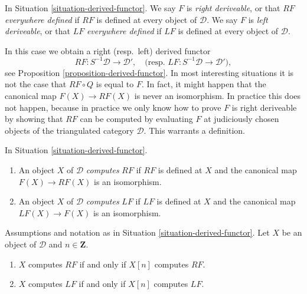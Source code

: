 \begin{definition}
\label{definition-everywhere-defined}
In
Situation \ref{situation-derived-functor}.
We say $F$ is {\it right deriveable}, or that $RF$ {\it everywhere defined}
if $RF$ is defined at every object of $\mathcal{D}$.
We say $F$ is {\it left deriveable}, or that $LF$ {\it everywhere defined}
if $LF$ is defined at every object of $\mathcal{D}$.
\end{definition}

\noindent
In this case we obtain a right (resp.\ left) derived functor
\begin{equation}
\label{equation-everywhere}
RF : S^{-1}\mathcal{D} \longrightarrow \mathcal{D}',
\quad\text{(resp. }
LF : S^{-1}\mathcal{D} \longrightarrow \mathcal{D}'),
\end{equation}
see
Proposition \ref{proposition-derived-functor}.
In most interesting situations it is not the case that $RF \circ Q$ is
equal to $F$. In fact, it might happen that the canonical map
$F(X) \to RF(X)$ is never an isomorphism. In practice this does not happen,
because in practice we only know how to prove $F$ is right deriveable by
showing that $RF$ can be computed by evaluating $F$ at judiciously chosen
objects of the triangulated category $\mathcal{D}$. This warrants
a definition.

\begin{definition}
\label{definition-computes}
In
Situation \ref{situation-derived-functor}.
\begin{enumerate}
\item An object $X$ of $\mathcal{D}$ {\it computes} $RF$ if $RF$ is defined
at $X$ and the canonical map $F(X) \to RF(X)$ is an isomorphism.
\item An object $X$ of $\mathcal{D}$ {\it computes} $LF$ if $LF$ is defined
at $X$ and the canonical map $LF(X) \to F(X)$ is an isomorphism.
\end{enumerate}
\end{definition}

\begin{lemma}
\label{lemma-computes-shift}
Assumptions and notation as in
Situation \ref{situation-derived-functor}.
Let $X$ be an object of $\mathcal{D}$ and $n \in \mathbf{Z}$.
\begin{enumerate}
\item $X$ computes $RF$ if and only if $X[n]$ computes $RF$.
\item $X$ computes $LF$ if and only if $X[n]$ computes $LF$.
\end{enumerate}
\end{lemma}


